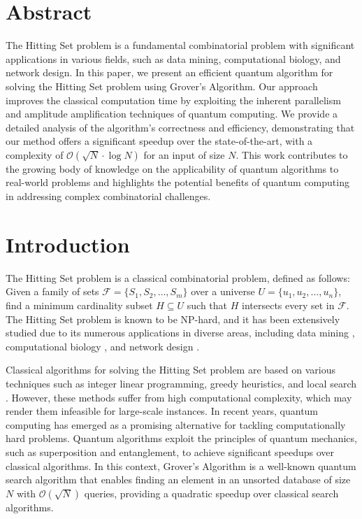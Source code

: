 \section{Abstract}
The Hitting Set problem is a fundamental combinatorial problem with significant applications in various fields, such as data mining, computational biology, and network design. In this paper, we present an efficient quantum algorithm for solving the Hitting Set problem using Grover's Algorithm. Our approach improves the classical computation time by exploiting the inherent parallelism and amplitude amplification techniques of quantum computing. We provide a detailed analysis of the algorithm's correctness and efficiency, demonstrating that our method offers a significant speedup over the state-of-the-art, with a complexity of $\mathcal{O}(\sqrt{N} \cdot \log{N})$ for an input of size $N$. This work contributes to the growing body of knowledge on the applicability of quantum algorithms to real-world problems and highlights the potential benefits of quantum computing in addressing complex combinatorial challenges.

\section{Introduction}
The Hitting Set problem is a classical combinatorial problem, defined as follows: Given a family of sets $\mathcal{F} = \{S_1, S_2, \dots, S_m\}$ over a universe $U = \{u_1, u_2, \dots, u_n\}$, find a minimum cardinality subset $H \subseteq U$ such that $H$ intersects every set in $\mathcal{F}$. The Hitting Set problem is known to be NP-hard, and it has been extensively studied due to its numerous applications in diverse areas, including data mining \cite{datamining}, computational biology \cite{compbio}, and network design \cite{network}.

Classical algorithms for solving the Hitting Set problem are based on various techniques such as integer linear programming, greedy heuristics, and local search \cite{classical}. However, these methods suffer from high computational complexity, which may render them infeasible for large-scale instances. In recent years, quantum computing has emerged as a promising alternative for tackling computationally hard problems. Quantum algorithms exploit the principles of quantum mechanics, such as superposition and entanglement, to achieve significant speedups over classical algorithms. In this context, Grover's Algorithm \cite{grover} is a well-known quantum search algorithm that enables finding an element in an unsorted database of size $N$ with $\mathcal{O}(\sqrt{N})$ queries, providing a quadratic speedup over classical search algorithms.


